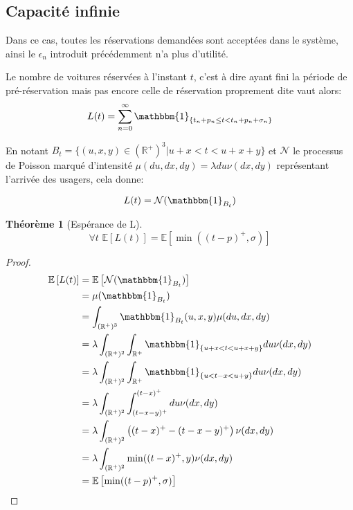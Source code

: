 \documentclass[12pt,a4paper]{article}
\newcommand{\E}[1]{\mathbb{E}\left[ #1 \right]}
\newcommand{\R}{\mathbb{R}}
\newcommand{\1}[1]{\mathbbm{1}_{\{#1\}} }
\newtheorem{theorem}{Théorème}
\theoremstyle{definition}
\begin{document}
{\subsection{Capacité infinie}

Dans ce cas, toutes les réservations demandées sont acceptées dans le système, ainsi le $\epsilon_n$ introduit précédemment n'a plus d'utilité.



Le nombre de voitures réservées à l'instant $t$, c'est à dire ayant fini la période de pré-réservation mais pas encore celle de réservation proprement dite vaut alors:
\begin{equation}
L(t) = \sum_{n=0}^{\infty} 	\mathbbm{1}_{\{t_n+p_n \leq t < t_n + p_n +\sigma_n\}}
\end{equation}

En notant $B_t = \{(u,x,y) \in \left(\mathbb{R}^+\right)^3  | u+x<t<u+x+y \} $ et $\mathcal{N}$ le processus de Poisson marqué d'intensité $\mu(du,dx,dy) = \lambda du \nu(dx,dy)$ représentant l'arrivée des usagers, cela donne:

\begin{equation}
L(t) = \mathcal{N}(\mathbbm{1}_{B_t})
\end{equation}



\begin{theorem}[Espérance de L]



\begin{equation}
\forall t\,\,\E{L(t)} = \E{\min((t-p)^+,\sigma)}	
\end{equation}

\end{theorem}

\begin{proof}
\begin{align*}
\E{L(t)} &= \E{\mathcal{N}(\mathbbm{1}_{B_t})}\\
&= \mu(\mathbbm{1}_{B_t})\\
&= \int_{(\R^+)^3} \mathbbm{1}_{B_t}(u,x,y) \mu(du,dx,dy)\\
&= \lambda \int_{(\R^+)^2} \int_{\R^+} \1{ u+x<t<u+x+y} du \nu(dx,dy)\\
&= \lambda \int_{(\R^+)^2} \int_{\R^+} \1{ u<t-x<u+y} du \nu(dx,dy)\\
&= \lambda \int_{(\R^+)^2} \int_{(t-x-y)^+}^{(t-x)^+} du \nu(dx,dy)\\
&= \lambda \int_{(\R^+)^2} \left((t-x)^+-(t-x-y)^+\right)  \nu(dx,dy)\\
&= \lambda \int_{(\R^+)^2} \min((t-x)^+,y)  \nu(dx,dy)\\
&= \E{\min((t-p)^+,\sigma)}	
\end{align*}


\end{proof}}
\end{document}
